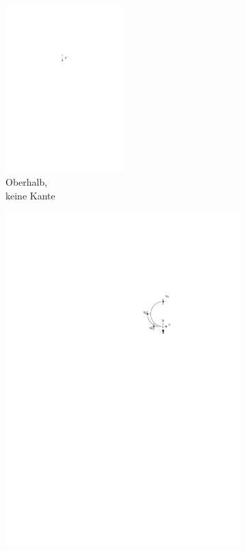\documentclass[a4paper]{scrreprt}
\theoremstyle{definition}
\begin{document}
\begin{figure}[h]
        \centering
        \begin{subfigure}[b]{0.2\textwidth}
                \includegraphics[width=0.5\textwidth]{schnitt_finden_top_none}
                \caption{Oberhalb,\\ keine Kante}
                \label{fig:cutfinding_top_none}
        \end{subfigure}%
        \quad
        \begin{subfigure}[b]{0.2\textwidth}
                \includegraphics[width=\textwidth]{schnitt_finden_top_upwards}

\end{subfigure}
\end{figure}
\end{document}
